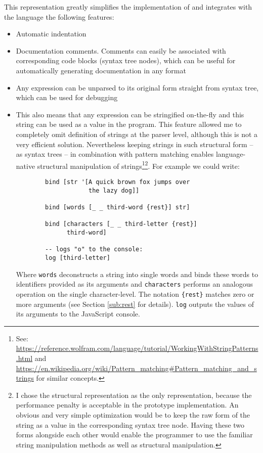 This representation greatly simplifies the implementation of and integrates with the language the following features:
\begin{itemize}
    \item Automatic indentation %
    \item Documentation comments. Comments can easily be associated with corresponding code blocks (syntax tree nodes), which can be useful for automatically generating documentation in any format
    \item Any expression can be unparsed to its original form straight from syntax tree, which can be used for debugging
    \item This also means that any expression can be stringified on-the-fly and this string can be used as a value in the program. This feature allowed me to completely omit definition of strings at the parser level, although this is not a very efficient solution. Nevertheless keeping strings in such structural form -- as syntax trees -- in combination with pattern matching enables language-native structural manipulation of strings\footnote{See: \url{https://reference.wolfram.com/language/tutorial/WorkingWithStringPatterns.html} and \url{https://en.wikipedia.org/wiki/Pattern_matching\#Pattern_matching_and_strings} for similar concepts.}\footnote{I chose the structural representation as the only representation, because the performance penalty is acceptable in the prototype implementation. An obvious and very simple optimization would be to keep the raw form of the string as a value in the corresponding syntax tree node. Having these two forms alongside each other would enable the programmer to use the familiar string manipulation methods as well as structural manipulation.}. For example we could write:
    \begin{lstlisting}
        bind [str '[A quick brown fox jumps over
                    the lazy dog]]
                    
        bind [words [_ _ third-word {rest}] str]
        
        bind [characters [_ _ third-letter {rest}]
              third-word]
        
        -- logs "o" to the console:
        log [third-letter]
    \end{lstlisting}
    
    Where \texttt{words} deconstructs a string into single words and binds these words to identifiers provided as its arguments and \texttt{characters} performs an analogous operation on the single character-level. The notation \texttt{\{rest\}} matches zero or more arguments (see Section \ref{sub:rest} for details). \texttt{log} outputs the values of its arguments to the JavaScript console.
\end{itemize}

